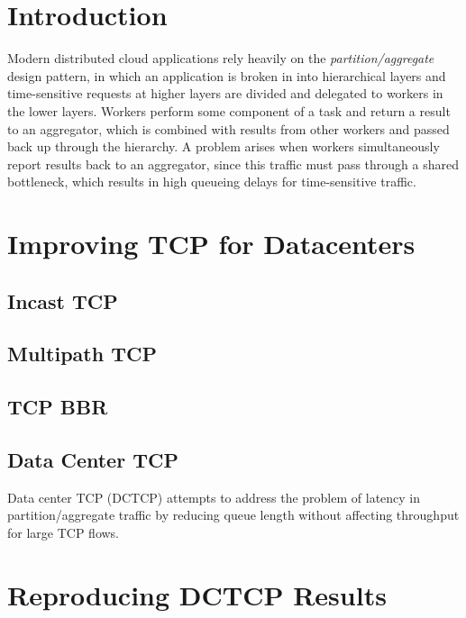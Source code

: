 \section{Introduction}

Modern distributed cloud applications rely heavily on the \emph{partition/aggregate} design pattern, in which an application is broken in into hierarchical layers and time-sensitive requests at higher layers are divided and delegated to workers in the lower layers. Workers perform some component of a task and return a result to an aggregator, which is combined with results from other workers and passed back up through the hierarchy. A problem arises when workers simultaneously report results back to an aggregator, since this traffic must pass through a shared bottleneck, which results in high queueing delays for time-sensitive traffic. 


\section{Improving TCP for Datacenters}

\subsection{Incast TCP}

\subsection{Multipath TCP}

\subsection{TCP BBR}

\subsection{Data Center TCP}

Data center TCP (DCTCP) attempts to address the problem of latency in partition/aggregate traffic by reducing queue length without affecting throughput for large TCP flows.

\section{Reproducing DCTCP Results}

